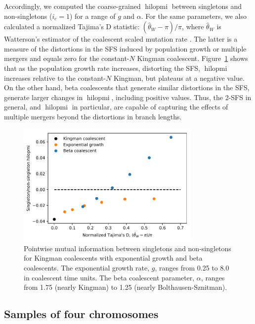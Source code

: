 \documentclass[11pt, letterpaper]{article}   	%
\newcommand{\Fig}[1]{Figure~\ref{#1}}
\DeclareMathOperator{\hilopmi}{hilopmi}
\begin{document}
Accordingly, we computed the coarse-grained $\hilopmi$ between singletons and non-singletons ($i_c = 1$) for a range of $g$ and $\alpha$.
For the same parameters, we also calculated a normalized Tajima's D statistic:
$(\hat{\theta}_W - \pi) / \pi$, where $\hat{\theta}_W$ is Watterson's estimator of the coalescent scaled mutation rate \autocite{Watterson19??}.
The latter is a measure of the distortions in the SFS induced by population growth or multiple mergers and equals zero for the constant-$N$ Kingman coalescent.
\Fig{fig:fpmi_vs_tajimasd} shows that as the population growth rate increases, distorting the SFS, $\hilopmi$ increases relative to the constant-$N$ Kingman, but plateaus at a negative value.
On the other hand, beta coalescents that generate similar distortions in the SFS, generate larger changes in $\hilopmi$, including positive values.
Thus, the 2-SFS in general, and $\hilopmi$ in particular, are capable of capturing the effects of multiple mergers beyond the distortions in branch lengths.

\begin{figure}
\centering
\includegraphics[width=0.8\textwidth]{figures/figure2.pdf}
\caption{Pointwise mutual information between singletons and non-singletons for Kingman coalescents with exponential growth and beta coalescents. The exponential growth rate, $g$, ranges from 0.25 to 8.0 in coalescent time units. The beta coalescent parameter, $\alpha$, ranges from 1.75 (nearly Kingman) to 1.25 (nearly Bolthausen-Sznitman). \label{fig:fpmi_vs_tajimasd}}
\end{figure}

\subsection*{Samples of four chromosomes}
\end{document}
